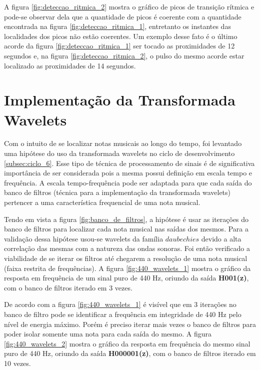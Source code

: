  A figura \ref{fig:deteccao_ritmica_2} mostra o gráfico de picos de transição rítmica e pode-se observar dela que a quantidade de picos é coerente com a quantidade encontrada na figura \ref{fig:deteccao_ritmica_1}, entretanto os instantes das localidades dos picos não estão coerentes. Um exemplo desse fato é o último acorde da figura \ref{fig:deteccao_ritmica_1} ser tocado as proximidades de 12 segundos e, na figura \ref{fig:deteccao_ritmica_2}, o pulso do mesmo acorde estar localizado as proximidades de 14 segundos.

\section{Implementação da Transformada Wavelets}
\label{sec:wavelets}
Com o intuito de se localizar notas musicais ao longo do tempo, foi levantado uma hipótese do uso da transformada wavelets no ciclo de desenvolvimento \ref{subsec:ciclo_6}. Esse tipo de técnica de processamento de sinais é de significativa importância de ser considerada pois a mesma possui definição em escala tempo e frequência. A escala tempo-frequência pode ser adaptada para que cada saída do banco de filtros (técnica para a implementação da transformada wavelets) pertencer a uma característica frequencial de uma nota musical.

Tendo em vista a figura \ref{fig:banco_de_filtros}, a hipótese é usar as iterações do banco de filtros para localizar cada nota musical nas saídas dos mesmos. Para a validação dessa hipótese usou-se wavelets da família $daubechies$ devido a alta correlação das mesmas com a natureza das ondas sonoras. Foi então verificado a viabilidade de se iterar os filtros até chegarem a resolução de uma nota musical (faixa restrita de frequências). A figura \ref{fig:440_wavelets_1} mostra o gráfico da resposta em frequência de um sinal puro de 440 Hz, oriundo da saída \textbf{H001(z)}, com o banco de filtros iterado em 3 vezes.

De acordo com a figura \ref{fig:440_wavelets_1} é visível que em 3 iterações no banco de filtro pode se identificar a frequência em integridade de 440 Hz pelo nível de energia máximo. Porém é preciso iterar mais vezes o banco de filtros para poder isolar somente uma nota para cada saída do mesmo. A figura \ref{fig:440_wavelets_2} mostra o gráfico da resposta em frequência do mesmo sinal puro de 440 Hz, oriundo da saída \textbf{H000001(z)}, com o banco de filtros iterado em 10 vezes.

